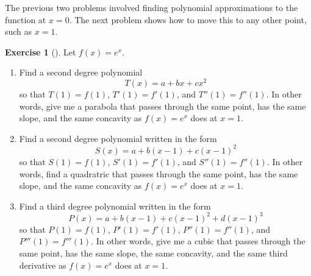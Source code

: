 \documentclass[10pt,]{book}
\theoremstyle{plain}
\theoremstyle{definition}
\theoremstyle{definition}
\theoremstyle{definition}
\theoremstyle{definition}
\newtheorem{exploration}[project]{Exercise}
\theoremstyle{definition}
\numberwithin{equation}{section}
\begin{document}
The previous two problems involved finding polynomial approximations to the function at \(x=0\). The next problem shows how to move this to any other point, such as \(x=1\).%
\begin{exploration}[]\label{Taylor_at_1}
Let \(f(x)=e^x\).%
\begin{enumerate}[font=\bfseries,label=(\alph*),ref=\alph*]
\item\label{task-22} Find a second degree polynomial%
\begin{equation*}
T(x)=a+bx+cx^2
\end{equation*}
so that \(T(1)=f(1)\), \(T'(1)=f'(1)\), and \(T''(1)=f''(1)\). In other words, give me a parabola that passes through the same point, has the same slope, and the same concavity as \(f(x)=e^x\) does at \(x=1\).%
\item\label{task-23} Find a second degree polynomial written in the form%
\begin{equation*}
S(x)=a+b(x-1)+c(x-1)^2
\end{equation*}
so that \(S(1)=f(1)\), \(S'(1)=f'(1)\), and \(S''(1)=f''(1)\). In other words, find a quadratric that passes through the same point, has the same slope, and the same concavity as \(f(x)=e^x\) does at \(x=1\).%
\item\label{task-24} Find a third degree polynomial written in the form%
\begin{equation*}
P(x)=a+b(x-1)+c(x-1)^2+d(x-1)^3
\end{equation*}
so that \(P(1)=f(1)\), \(P'(1)=f'(1)\), \(P''(1)=f''(1)\), and \(P'''(1)=f'''(1)\). In other words, give me a cubic that passes through the same point, has the same slope, the same concavity, and the same third derivative as \(f(x)=e^x\) does at \(x=1\).%
\end{enumerate}
\end{exploration}
\end{document}
